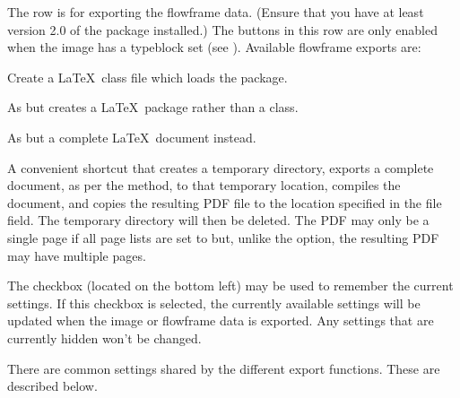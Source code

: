 The  row is for exporting the
\gls{flowframe} data. (Ensure that you have at least version 2.0 of
the  package installed.) The buttons in this row are only enabled when
the image has a \gls{typeblock} set
(see ). Available \gls{flowframe}
exports are:
\begin{deflist}

\begin{itemdesc}
Create a \LaTeX\ class file which loads the  package.
\end{itemdesc}


\begin{itemdesc}
As  but creates a \LaTeX\ package rather than a
class.
\end{itemdesc}


\begin{itemdesc}
As  but a complete \LaTeX\ document instead.
\end{itemdesc}


\begin{itemdesc}
A convenient shortcut that creates a temporary directory, 
exports a complete document, as per the  method, to that
temporary location, compiles the document, and copies the resulting
PDF file to the location specified in the file field. The temporary
directory will then be deleted.
The PDF may only be a single page if all page lists are set to
 but, unlike the  option,
the resulting PDF may have multiple pages.
\end{itemdesc}
\end{deflist}


The  checkbox (located on the bottom left)
may be used to remember the current settings. If this checkbox is
selected, the currently available settings will be updated when the
image or \gls{flowframe} data is exported. Any settings that are
currently hidden won't be changed.

There are common settings shared by the different export functions.
These are described below.



